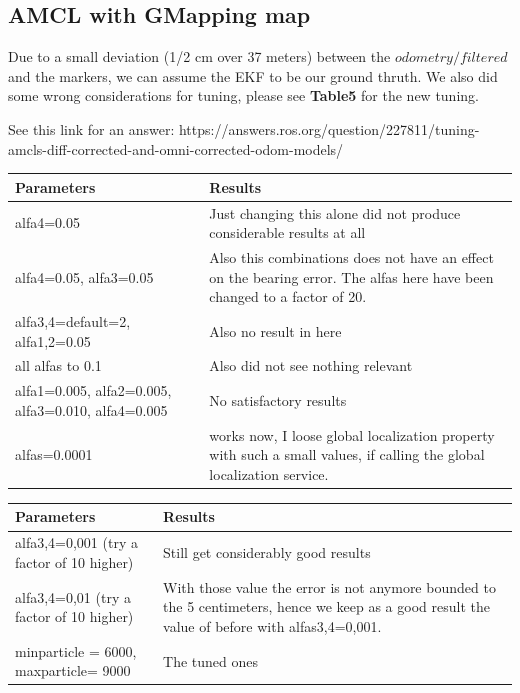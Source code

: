 \documentclass[11pt,a4paper]{article}
\begin{document}
\subsection{AMCL with GMapping map}



Due to a small deviation (1/2 cm over 37 meters) between the $odometry/filtered$ and the markers, we can assume the EKF to be our ground thruth. We also did some wrong considerations for tuning, please see \textbf{Table5} for the new tuning.

See this link for an answer: https://answers.ros.org/question/227811/tuning-amcls-diff-corrected-and-omni-corrected-odom-models/

\begin{center}
\begin{tabular}{| m{12em} | m{13em}|} 
\hline
\textbf{Parameters} & \textbf{Results} \\
\hline
 alfa4=0.05 &  Just changing this alone did not produce considerable results at all\\
\hline
 alfa4=0.05, alfa3=0.05 &  Also this combinations does not have an effect on the bearing error. The alfas here have been changed to a factor of 20.\\
\hline
 alfa3,4=default=2, alfa1,2=0.05 & Also no result in here \\
\hline
all alfas to 0.1 & Also did not see nothing relevant\\
\hline
alfa1=0.005, alfa2=0.005, alfa3=0.010, alfa4=0.005& No satisfactory results\\
\hline
alfas=0.0001 & works now, I loose global localization property with such a small values, if calling the global localization service. \\
\hline
\end{tabular}
\end{center}

\begin{center}
\begin{tabular}{| m{12em} | m{13em}|} 
\hline
\textbf{Parameters} & \textbf{Results} \\
\hline
alfa3,4=0,001 (try a factor of 10 higher) & Still get considerably good results \\
\hline
\hline
alfa3,4=0,01 (try a factor of 10 higher) & With those value the error is not anymore bounded to the 5 centimeters, hence we keep as a good result the value of before with alfas3,4=0,001. \\
\hline
minparticle = 6000, maxparticle= 9000 & The tuned ones\\
\hline
\end{tabular}
\end{center}
\end{document}
